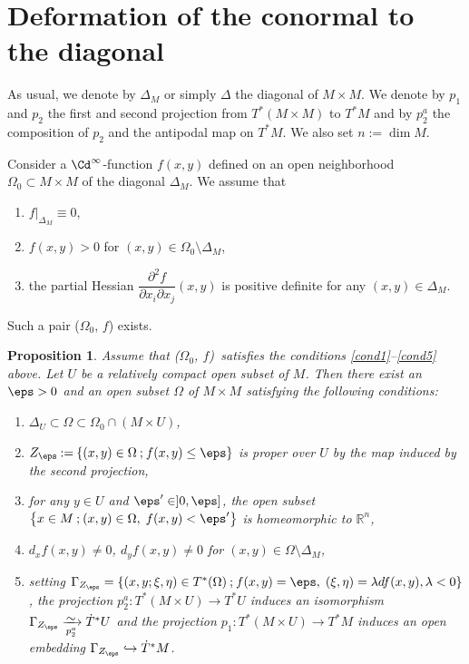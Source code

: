 \documentclass[12pt,leqno]{article}
\newtheorem{proposition}[theorem]{Proposition}
\theoremstyle{definition}
\newcommand{\R}{{\mathbb{R}}}
\renewcommand{\to}[1][]{\xrightarrow[]{#1}}
\newcommand{\isoto}[1][]{\xrightarrow[#1]%
{{\raisebox{-.6ex}[0ex][-.6ex]{$\mspace{1mu}\sim\mspace{2mu}$}}}}
\newcommand{\eqdot}{\mathbin{:=}}
\newcommand{\seteq}{\mathbin{:=}}
\newcommand{\cl}{\colon}
\newcommand{\lp}{{\rm(}}
\newcommand{\rp}{{\rm)}}
\newcommand{\bnum}{\begin{enumerate}[{\rm(i)}]}
\newcommand{\enum}{\end{enumerate}}
\newcommand{\banum}{\begin{enumerate}[{\rm(a)}]}
\newcommand{\eanum}{\end{enumerate}}
\newcommand{\set}[2]{\left\{#1 \mathbin{;} #2 \right\}}
\newcommand{\dT}{{\dot{T}}}
\newcommand{\dTM}{{\dT}^*M}
\numberwithin{equation}{section}
\begin{document}
\section{Deformation of the conormal to the diagonal}

As usual, we denote by $\Delta_M$ or simply $\Delta$ the diagonal of $M\times M$.
We denote by $p_1$ and $p_2$ the first and second projection from 
$T^*(M\times M)$ to $T^*M$ and by $p_2^a$ the composition of $p_2$ and the
antipodal map on $T^*M$.
We also set $n\eqdot\dim M$.
 
Consider a $\Cd^\infty$-function $f(x,y)$ defined on an open neighborhood $\Omega_0
\subset M\times M$ of the diagonal $\Delta_M$.
We assume that
\bnum
\item
$f\vert_{\Delta_M}\equiv0$,
\label{cond1}
\item
$f(x,y)>0$ for $(x,y)\in \Omega_0\setminus \Delta_M$,
\item
the partial Hessian $\dfrac{\partial^2f}{\partial x_i\partial x_j}(x,y)$
is positive definite for any $(x,y)\in\Delta_M$.
\label{cond5}
\enum
Such a pair ($\Omega_0$, $f$) exists.

\begin{proposition}\label{prop:1}
Assume that \lp$\Omega_0$, $f$\rp\,  satisfies the conditions 
\eqref{cond1}--\eqref{cond5} above.
Let $U$ be a relatively compact open subset of $M$.
Then there exist an $\eps>0$ and an open subset $\Omega$ 
of $M\times M$ satisfying the following conditions:
\banum
\item
$\Delta_U\subset\Omega\subset\Omega_0\cap (M\times U)$,
\item
$Z_\eps\seteq \set{(x,y)\in\Omega}{f(x,y)\leq\eps}$ is proper over $U$
by the map induced by the second projection,
\item
for any $y\in U$ and $\eps'\in]0,\eps]$, the open subset
$\set{x\in M}{(x,y)\in\Omega,\;f(x,y)<\eps'}$ is homeomorphic to $\R^n$,
\label{cond:shere}
\item
$d_xf(x,y)\not=0$, $d_yf(x,y)\not=0$ for $(x,y)\in \Omega\setminus \Delta_M$,
\label{cond:diff}
\item
setting 
$\Gamma_{Z_\eps}=\set{(x,y;\xi,\eta)\in T^*(\Omega)}%
{f(x,y)=\eps,\;(\xi,\eta)=\lambda df(x,y),\lambda<0}$,
the projection $p_2^a\cl T^*(M\times U)\to T^*U$ 
induces an isomorphism
$\Gamma_{Z_\eps}\isoto[p_2^a]\dot T^*U$ and
the projection $p_1\cl T^*(M\times U)\to T^*M$ 
induces an open embedding
$\Gamma_{Z_\eps}\hookrightarrow\dTM$.
\eanum
\end{proposition}
\end{document}
